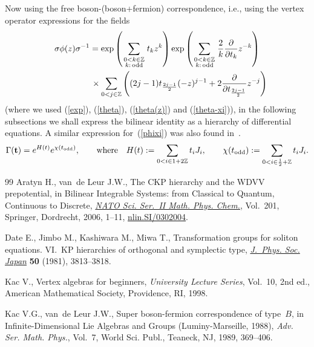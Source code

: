\documentclass[11pt]{article}
\numberwithin{equation}{section}
\newcommand{\Z}{\mathbb{Z}}
\newcommand{\INZ}[2]{\in\frac#1#2 +\mathbb{Z}}
\begin{document}
Now using the free boson-(boson+fermion) correspondence, i.e.,
using the vertex operator expressions for the f\/ields
\begin{gather}
\sigma\phi(z)\sigma^{-1} =
\exp\left( \sum_{\scriptstyle0<k\in\mathbb{Z}\atop\scriptstyle k:\,\mathrm{odd}}t_kz^k \right)
\exp\left( \sum_{\scriptstyle0<k\in\mathbb{Z}\atop\scriptstyle k:\,\mathrm{odd}}
\frac{2}{k}\frac{\partial}{\partial t_k}z^{-k} \right)\nonumber\\
\hphantom{\sigma\phi(z)\sigma^{-1} =}{}\times
\sum_{0<j\in\mathbb{Z}}\left( (2j-1)t_{\frac{2j-1}2}(-z)^{j-1}+2\frac{\partial}{\partial
t_{\frac{2j-1}2}}z^{-j} \right)\label{phixi}
\end{gather}
(where we used (\ref{exp}), (\ref{theta}), (\ref{theta(z)}) and (\ref{theta-xi})),
in the following subsections
we shall express the bilinear identity as a hierarchy of dif\/ferential equations.
A similar expression  for~(\ref{phixi}) was also found in~\cite{Kac-Leur}.
\setcounter{section}{2}
\setcounter{subsection}{5}
\setcounter{subsubsection}{0}
\setcounter{equation}{27}
\begin{gather}\label{Gamma-bt2}
\Gamma({\bf t})=e^{H(t)}e^{\chi(t_\mathrm{odd})} ,\qquad  \mbox{where}\quad
H(t):=\sum_{0< i\in 1+2\Z}  t_i J_{i} ,\qquad
\chi(t_\mathrm{odd}):=\sum_{0< i\INZ12}  t_i J_{i} .
\end{gather}
\begin{thebibliography}{99}
Aratyn H., van~de Leur J.W., The {CKP} hierarchy and the {WDVV} prepotential, in
  Bilinear Integrable Systems: from Classical to Quantum, Continuous to
  Discrete, \href{http://dx.doi.org/10.1007/978-1-4020-3503-6_1}{\textit{NATO Sci. Ser.~II Math. Phys. Chem.}}, Vol.~201, Springer,
  Dordrecht, 2006, 1--11, \href{http://arxiv.org/abs/nlin.SI/0302004}{nlin.SI/0302004}.

Date E., Jimbo M., Kashiwara M., Miwa T., Transformation groups for soliton
  equations. {VI}.~{KP} hierarchies of orthogonal and symplectic type,
  \href{http://dx.doi.org/10.1143/JPSJ.50.3813}{\textit{J.~Phys. Soc. Japan}} \textbf{50} (1981), 3813--3818.

Kac V., Vertex algebras for beginners, \textit{University Lecture Series},
  Vol.~10, 2nd ed., American Mathematical Society, Providence, RI, 1998.

Kac V.G., van~de Leur J.W., Super boson-fermion correspondence of type~$B$, in
  Inf\/inite-Dimensional {L}ie Algebras and Groups ({L}uminy-{M}arseille, 1988),
  \textit{Adv. Ser. Math. Phys.}, Vol.~7, World Sci. Publ., Teaneck, NJ, 1989,
  369--406.

\end{thebibliography}
\end{document}
